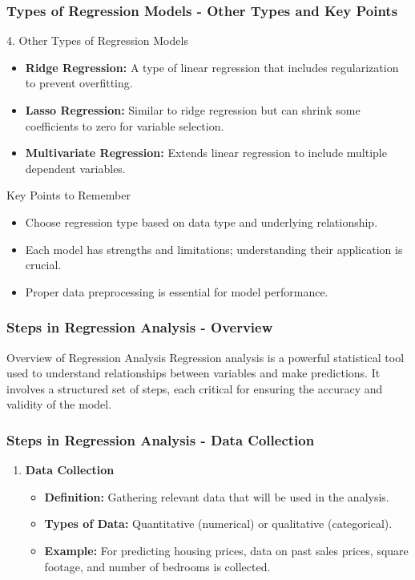 \documentclass{beamer}
\begin{document}
\begin{frame}[fragile]
    \frametitle{Types of Regression Models - Other Types and Key Points}
    \begin{block}{4. Other Types of Regression Models}
        \begin{itemize}
            \item \textbf{Ridge Regression:} A type of linear regression that includes regularization to prevent overfitting.
            \item \textbf{Lasso Regression:} Similar to ridge regression but can shrink some coefficients to zero for variable selection.
            \item \textbf{Multivariate Regression:} Extends linear regression to include multiple dependent variables.
        \end{itemize}
    \end{block}
    
    \begin{block}{Key Points to Remember}
        \begin{itemize}
            \item Choose regression type based on data type and underlying relationship.
            \item Each model has strengths and limitations; understanding their application is crucial.
            \item Proper data preprocessing is essential for model performance.
        \end{itemize}
    \end{block}
\end{frame}

\begin{frame}[fragile]
    \frametitle{Steps in Regression Analysis - Overview}
    \begin{block}{Overview of Regression Analysis}
        Regression analysis is a powerful statistical tool used to understand relationships between variables and make predictions. It involves a structured set of steps, each critical for ensuring the accuracy and validity of the model.
    \end{block}
\end{frame}

\begin{frame}[fragile]
    \frametitle{Steps in Regression Analysis - Data Collection}
    \begin{enumerate}
        \item \textbf{Data Collection}
        \begin{itemize}
            \item \textbf{Definition:} Gathering relevant data that will be used in the analysis.
            \item \textbf{Types of Data:} Quantitative (numerical) or qualitative (categorical).
            \item \textbf{Example:} For predicting housing prices, data on past sales prices, square footage, and number of bedrooms is collected.
        \end{itemize}
    \end{enumerate}
\end{frame}
\end{document}
